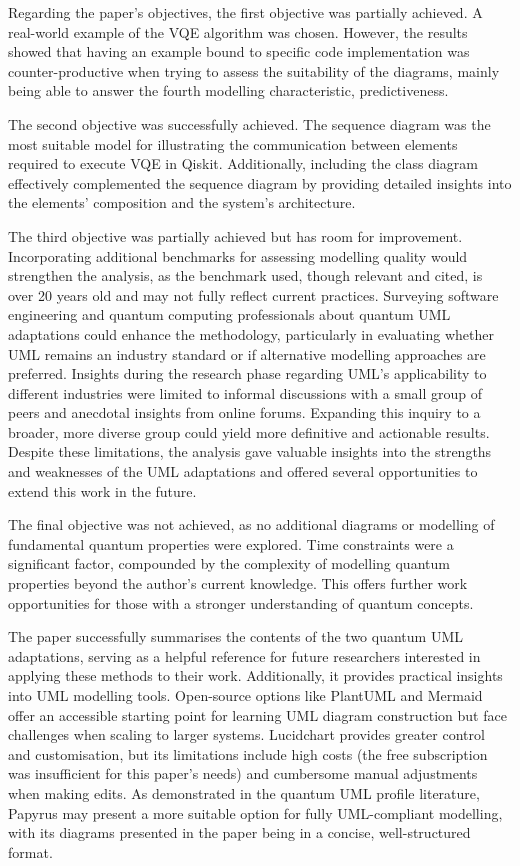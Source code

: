 \documentclass{article}
\begin{document}
Regarding the paper's objectives, the first objective was partially achieved. A real-world example of the VQE algorithm was chosen. However, the results showed that having an example bound to specific code implementation was counter-productive when trying to assess the suitability of the diagrams, mainly being able to answer the fourth modelling characteristic, predictiveness.

The second objective was successfully achieved. The sequence diagram was the most suitable model for illustrating the communication between elements required to execute VQE in Qiskit. Additionally, including the class diagram effectively complemented the sequence diagram by providing detailed insights into the elements' composition and the system's architecture.

The third objective was partially achieved but has room for improvement. Incorporating additional benchmarks for assessing modelling quality would\\ strengthen the analysis, as the benchmark used, though relevant and cited, is over 20 years old and may not fully reflect current practices. Surveying software engineering and quantum computing professionals about quantum UML adaptations could enhance the methodology, particularly in evaluating whether UML remains an industry standard or if alternative modelling approaches are preferred. Insights during the research phase regarding UML's applicability to different industries were limited to informal discussions with a small group of peers and anecdotal insights from online forums\cite{redditumloften}. Expanding this inquiry to a broader, more diverse group could yield more definitive and actionable results. Despite these limitations, the analysis gave valuable insights into the strengths and weaknesses of the UML adaptations and offered several opportunities to extend this work in the future. 

The final objective was not achieved, as no additional diagrams or modelling of fundamental quantum properties were explored. Time constraints were a significant factor, compounded by the complexity of modelling quantum properties beyond the author’s current knowledge. This offers further work opportunities for those with a stronger understanding of quantum concepts.

The paper successfully summarises the contents of the two quantum UML adaptations, serving as a helpful reference for future researchers interested in applying these methods to their work. Additionally, it provides practical insights into UML modelling tools. Open-source options like PlantUML and Mermaid offer an accessible starting point for learning UML diagram construction but face challenges when scaling to larger systems. Lucidchart provides greater control and customisation, but its limitations include high costs (the free subscription was insufficient for this paper’s needs) and cumbersome manual adjustments when making edits. As demonstrated in the quantum UML profile literature, Papyrus may present a more suitable option for fully UML-compliant modelling, with its diagrams presented in the paper being in a concise, well-structured format.
\end{document}
